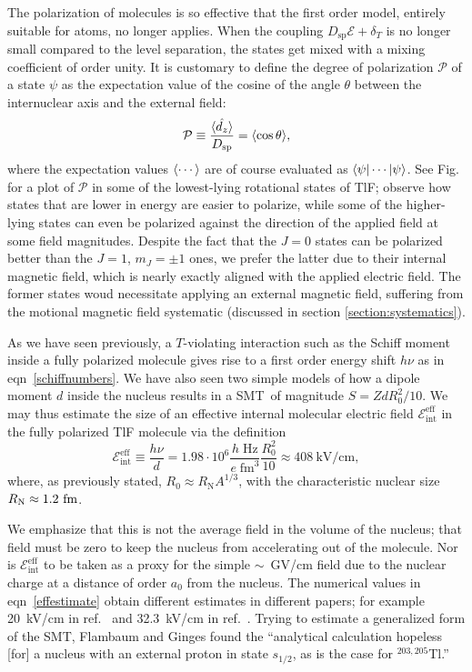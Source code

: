 The polarization of molecules is so effective that the first order model,
entirely suitable for atoms, no longer applies. When the coupling
$D_\text{sp}\mathcal{E}+\delta_T$ is no longer small compared to the level
separation, the states get mixed with a mixing coefficient of order unity. It is
customary to define the degree of polarization $\mathcal{P}$ of a state $\psi$
as the expectation value of the cosine of the angle $\theta$ between the
internuclear axis and the external field:
%
\begin{equation}
    \label{polarizationdefinition}
    \mathcal{P}\equiv
    \frac{\langle \hat{d_z}\rangle}{D_\text{sp}}
    =\langle \cos\theta\rangle,
\end{equation}
%
where the expectation values $\langle \cdots\rangle$ are of course evaluated as
$\langle\psi|\cdots|\psi\rangle$. See Fig.~ for a plot of $\mathcal{P}$
in some of the lowest-lying rotational states of TlF; observe how states that
are lower in energy are easier to polarize, while some of the higher-lying
states can even be polarized against the direction of the applied field at some
field magnitudes. Despite the fact that the $J=0$ states can be polarized better
than the $J=1$, $m_J=\pm1$ ones, we prefer the latter due to their internal
magnetic field, which is nearly exactly aligned with the applied electric field.
The former states woud necessitate applying an external magnetic field,
suffering from the motional magnetic field systematic (discussed in section
\ref{section:systematics}).

As we have seen previously, a $T$-violating interaction such as the Schiff
moment inside a fully polarized molecule gives rise to a first order energy
shift $h\nu$ as in eqn~\ref{schiffnumbers}. We have also seen two simple models
of how a dipole moment $d$ inside the nucleus results in a \gls{SMT}\ of
magnitude $S=ZdR_0^2/10$. We may thus estimate the size of an effective internal
molecular electric field $\mathcal E_\text{int}^\text{eff}$ in the
fully polarized TlF molecule via the definition
%
\begin{equation}
    \label{effestimate}
    \mathcal E_\text{int}^\text{eff}\equiv\frac{h\nu}{d}
    =1.98\cdot10^6\frac{h\;\text{Hz}}{e\;\text{fm}^3}\frac{R_0^2}{10}
    \approx408~\text{kV/cm},
\end{equation}
%
where, as previously stated, $R_0\approx R_\text{N}A^{1/3}$, with the
characteristic nuclear size $R_\text{N}\approx1.2~\mathrm{fm}$.

We emphasize that this is not the average field in the volume of the nucleus;
that field must be zero to keep the nucleus from accelerating out of the
molecule. Nor is $\mathcal E_\text{int}^\text{eff}$ to be taken as a proxy for
the simple $\sim$~GV/cm field due to the nuclear charge at a distance of order
$a_0$ from the nucleus. The numerical values in
eqn~\ref{effestimate} obtain different estimates in different papers; for
example 20~kV/cm in ref.~\cite{harrison1969experimental} and 32.3~kV/cm in
ref.~\cite{petrov2002calculation}. Trying to estimate a generalized form of the
\gls{SMT}, Flambaum and Ginges \cite{flambaum2002nuclear} found the ``analytical
calculation hopeless [for] a nucleus with an external proton in state $s_{1/2}$,
as is the case for $^{203,205}$Tl.''

